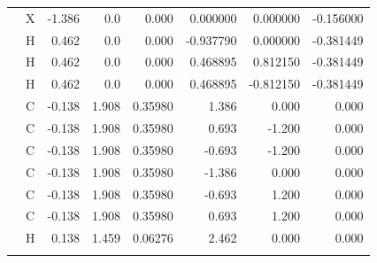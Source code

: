 \begin{table}[h]
\begin{centering}
\begin{tabular*}{1\linewidth}{@{\extracolsep{\fill}}llrrrrrr}
\addlinespace[-0.17em]
\addlinespace[-0.33em]
 & {\scriptsize{}X} & {\scriptsize{}-1.386} & {\scriptsize{}0.0} & {\scriptsize{}0.000} & {\scriptsize{}0.000000} & {\scriptsize{}0.000000} & {\scriptsize{}-0.156000}\tabularnewline
\addlinespace[-0.17em]
\addlinespace[-0.33em]
 & {\scriptsize{}H} & {\scriptsize{}0.462} & {\scriptsize{}0.0} & {\scriptsize{}0.000} & {\scriptsize{}-0.937790} & {\scriptsize{}0.000000} & {\scriptsize{}-0.381449}\tabularnewline
\addlinespace[-0.17em]
\addlinespace[-0.33em]
 & {\scriptsize{}H} & {\scriptsize{}0.462} & {\scriptsize{}0.0} & {\scriptsize{}0.000} & {\scriptsize{}0.468895} & {\scriptsize{}0.812150} & {\scriptsize{}-0.381449}\tabularnewline
\addlinespace[-0.17em]
\addlinespace[-0.33em]
 & {\scriptsize{}H} & {\scriptsize{}0.462} & {\scriptsize{}0.0} & {\scriptsize{}0.000} & {\scriptsize{}0.468895} & {\scriptsize{}-0.812150} & {\scriptsize{}-0.381449}\tabularnewline
\addlinespace[-0.17em]
\midrule 
\addlinespace[-0.33em]
{\scriptsize{}Benzene \citep{Chipot_1996}} & {\scriptsize{}C} & {\scriptsize{}-0.138} & {\scriptsize{}1.908 } & {\scriptsize{}0.35980 } & {\scriptsize{}1.386 } & {\scriptsize{}0.000} & {\scriptsize{}0.000}\tabularnewline
\addlinespace[-0.17em]
\addlinespace[-0.33em]
{\scriptsize{}(charged)} & {\scriptsize{}C} & {\scriptsize{}-0.138} & {\scriptsize{}1.908 } & {\scriptsize{}0.35980 } & {\scriptsize{}0.693} & {\scriptsize{}-1.200} & {\scriptsize{}0.000}\tabularnewline
\addlinespace[-0.17em]
\addlinespace[-0.33em]
 & {\scriptsize{}C} & {\scriptsize{}-0.138} & {\scriptsize{}1.908 } & {\scriptsize{}0.35980 } & {\scriptsize{}-0.693} & {\scriptsize{}-1.200} & {\scriptsize{}0.000}\tabularnewline
\addlinespace[-0.17em]
\addlinespace[-0.33em]
 & {\scriptsize{}C} & {\scriptsize{}-0.138} & {\scriptsize{}1.908 } & {\scriptsize{}0.35980 } & {\scriptsize{}-1.386} & {\scriptsize{}0.000} & {\scriptsize{}0.000}\tabularnewline
\addlinespace[-0.17em]
\addlinespace[-0.33em]
 & {\scriptsize{}C} & {\scriptsize{}-0.138} & {\scriptsize{}1.908 } & {\scriptsize{}0.35980 } & {\scriptsize{}-0.693} & {\scriptsize{}1.200} & {\scriptsize{}0.000}\tabularnewline
\addlinespace[-0.17em]
\addlinespace[-0.33em]
 & {\scriptsize{}C} & {\scriptsize{}-0.138} & {\scriptsize{}1.908 } & {\scriptsize{}0.35980 } & {\scriptsize{}0.693} & {\scriptsize{}1.200} & {\scriptsize{}0.000}\tabularnewline
\addlinespace[-0.17em]
\addlinespace[-0.33em]
 & {\scriptsize{}H} & {\scriptsize{}0.138 } & {\scriptsize{}1.459} & {\scriptsize{}0.06276 } & {\scriptsize{}2.462} & {\scriptsize{}0.000} & {\scriptsize{}0.000}\tabularnewline
\addlinespace[-0.17em]
\addlinespace[-0.33em]

\end{tabular*}
\end{centering}
\end{table}
